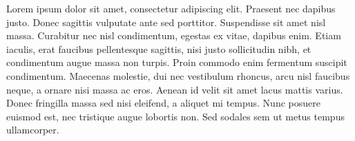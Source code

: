 Lorem ipsum dolor sit amet, consectetur adipiscing elit. Praesent nec dapibus justo. Donec sagittis vulputate ante sed porttitor. Suspendisse sit amet nisl massa. Curabitur nec nisl condimentum, egestas ex vitae, dapibus enim. Etiam iaculis, erat faucibus pellentesque sagittis, nisi justo sollicitudin nibh, et condimentum augue massa non turpis. Proin commodo enim fermentum suscipit condimentum. Maecenas molestie, dui nec vestibulum rhoncus, arcu nisl faucibus neque, a ornare nisi massa ac eros. Aenean id velit sit amet lacus mattis varius. Donec fringilla massa sed nisi eleifend, a aliquet mi tempus. Nunc posuere euismod est, nec tristique augue lobortis non. Sed sodales sem ut metus tempus ullamcorper.


























